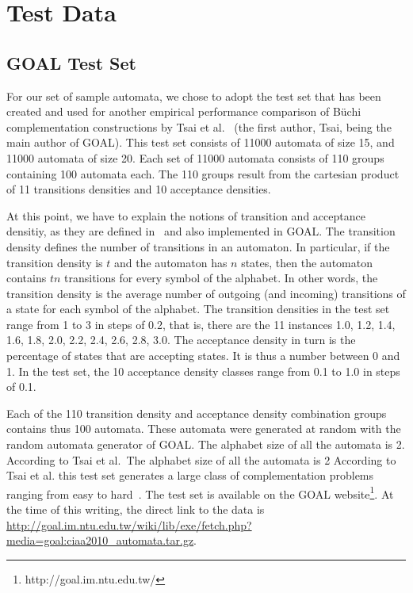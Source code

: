 \section{Test Data}
\subsection{GOAL Test Set}
\label{goal_testset}
For our set of sample automata, we chose to adopt the test set that has been created and used for another empirical performance comparison of Büchi complementation constructions by Tsai et al.~\cite{2010_tsai} (the first author, Tsai, being the main author of GOAL). This test set consists of 11000 automata of size 15, and 11000 automata of size 20. Each set of 11000 automata consists of 110 groups containing 100 automata each. The 110 groups result from the cartesian product of 11 transitions densities and 10 acceptance densities.

At this point, we have to explain the notions of transition and acceptance densitiy, as they are defined in~\cite{2010_tsai} and also implemented in GOAL. The transition density defines the number of transitions in an automaton. In particular, if the transition density is $t$ and the automaton has $n$ states, then the automaton contains $tn$ transitions for every symbol of the alphabet. In other words, the transition density is the average number of outgoing (and incoming) transitions of a state for each symbol of the alphabet. The transition densities in the test set range from 1 to 3 in steps of 0.2, that is, there are the 11 instances 1.0, 1.2, 1.4, 1.6, 1.8, 2.0, 2.2, 2.4, 2.6, 2.8, 3.0. The acceptance density in turn is the percentage of states that are accepting states. It is thus a number between 0 and 1. In the test set, the 10 acceptance density classes range from 0.1 to 1.0 in steps of 0.1.

Each of the 110 transition density and acceptance density combination groups contains thus 100 automata. These automata were generated at random with the random automata generator of GOAL. The alphabet size of all the automata is 2. According to Tsai et al.~The alphabet size of all the automata is 2 According to Tsai et al. this test set generates a large class of complementation problems ranging from easy to hard~\cite{2010_tsai}. The test set is available on the GOAL website\footnote{http://goal.im.ntu.edu.tw/}. At the time of this writing, the direct link to the data is \url{http://goal.im.ntu.edu.tw/wiki/lib/exe/fetch.php?media=goal:ciaa2010_automata.tar.gz}.

